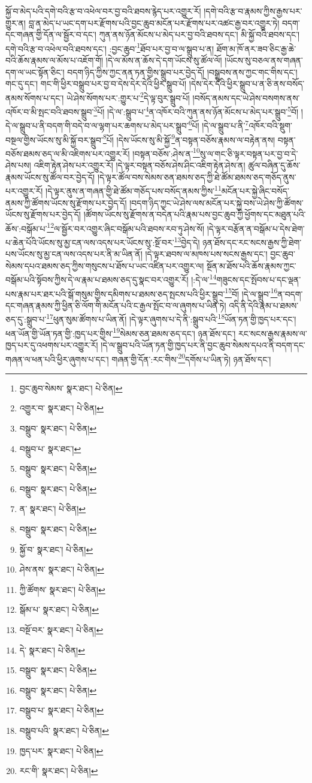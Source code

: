 སྐྱོ་བ་མེད་པའི་དགེ་བའི་རྩ་བ་འཕེལ་བར་བྱ་བའི་ཐབས་རྙེད་པར་འགྱུར་རོ། །དགེ་བའི་རྩ་བ་རྣམས་ཀྱིས་རྒྱས་པར་གྱུར་ན། བླ་ན་མེད་པ་ཡང་དག་པར་རྫོགས་པའི་བྱང་ཆུབ་མངོན་པར་རྫོགས་པར་འཚང་རྒྱ་བར་འགྱུར་ཏེ། བདག་དང་གཞན་གྱི་དོན་ལ་སྦྱོར་བ་དང་། ཀུན་ནས་ཉོན་མོངས་པ་མེད་པར་བྱ་བའི་ཐབས་དང་། མི་སྐྱོ་བའི་ཐབས་དང་། དགེ་བའི་རྩ་བ་འཕེལ་བའི་ཐབས་དང་། :བྱང་ཆུབ་\footnote{བྱང་ཆུབ་སེམས་  སྣར་ཐང་།  པེ་ཅིན། }ཐོབ་པར་བྱ་བ་ལ་སྒྲུབ་པ་ན། ཐོག་མ་ཁོ་ནར་ཟབ་ཅིང་རྒྱ་ཆེ་བའི་ཆོས་རྣམས་ལ་མོས་པ་འཇོག་གོ། །དེ་ལ་མོས་ན་ཆོས་དེ་དག་ཡོངས་སུ་ཚོལ་ལོ། །ཡོངས་སུ་བཅལ་ནས་གཞན་དག་ལ་ཡང་སྟོན་ཅིང་། བདག་ཉིད་ཀྱིས་ཀྱང་ནན་ཏན་གྱིས་སྒྲུབ་པར་བྱེད་དོ། །བསྒྲུབས་ནས་ཀྱང་གང་གིས་དང་། གང་དུ་དང་། གང་གི་ཕྱིར་བསྒྲུབ་པར་བྱ་བ་དེས་དེར་དེའི་ཕྱིར་སྒྲུབ་པོ། །དེས་དེར་དེའི་ཕྱིར་སྒྲུབ་པ་ན་ཅི་ནས་བསོད་ནམས་སོགས་པ་དང་། ཡེ་ཤེས་སོགས་པར་:གྱུར་པ་\footnote{འགྱུར་བ་  སྣར་ཐང་།  པེ་ཅིན། }དེ་ལྟ་བུར་སྒྲུབ་པོ། །བསོད་ནམས་དང་ཡེ་ཤེས་བསགས་ནས་འཁོར་བ་མི་སྤང་བའི་ཐབས་སྒྲུབ་\footnote{བསྒྲུབ་  སྣར་ཐང་།  པེ་ཅིན། }པོ། །དེ་ལ་:སྒྲུབ་པ་\footnote{བསྒྲུབ་པ་  སྣར་ཐང་། }ན་འཁོར་བའི་ཀུན་ནས་ཉོན་མོངས་པ་མེད་པར་སྒྲུབ་\footnote{བསྒྲུབ་  སྣར་ཐང་།  པེ་ཅིན། }བོ། །དེ་ལ་སྒྲུབ་པ་ནི་བདག་གི་བདེ་བ་ལ་ལྷག་པར་ཆགས་པ་མེད་པར་སྒྲུབ་\footnote{བསྒྲུབ་  སྣར་ཐང་།  པེ་ཅིན། }པོ། །དེ་ལ་སྒྲུབ་པ་ནི་\footnote{ན་  སྣར་ཐང་།  པེ་ཅིན། }འཁོར་བའི་སྡུག་བསྔལ་གྱིས་ཡོངས་སུ་མི་སྐྱོ་བར་སྒྲུབ་\footnote{བསྒྲུབ་  སྣར་ཐང་།  པེ་ཅིན། }པོ། །དེས་ཡོངས་སུ་མི་སྐྱོ་\footnote{སྐྱོ་བ་  སྣར་ཐང་།  པེ་ཅིན། }ན་བསྟན་བཅོས་རྣམས་ལ་བརྟེན་ནས། བསྟན་བཅོས་ཐམས་ཅད་ལ་མི་འཇིགས་པར་འགྱུར་རོ། །བསྟན་བཅོས་:ཤེས་ན་\footnote{ཤེས་ནས་  སྣར་ཐང་།  པེ་ཅིན། }སུ་ལ་གང་ཅི་ལྟར་བསྟན་པར་བྱ་བ་དེ་ཤེས་པས། འཇིག་རྟེན་ཤེས་པར་འགྱུར་རོ། །དེ་ལྟར་བསྟན་བཅོས་ཤེས་ཤིང་འཇིག་རྟེན་ཤེས་ན། ཚུལ་བཞིན་དུ་ཆོས་རྣམས་ཡོངས་སུ་ཚོལ་བར་བྱེད་དོ། །དེ་ལྟར་ཚོལ་བས་སེམས་ཅན་ཐམས་ཅད་ཀྱི་ཐེ་ཚོམ་ཐམས་ཅད་གཅོད་ནུས་པར་འགྱུར་རོ། །དེ་ལྟར་ནུས་ན་གཞན་གྱི་ཐེ་ཚོམ་གཅོད་པས་བསོད་ནམས་ཀྱིས་\footnote{ཀྱི་ཚོགས་  སྣར་ཐང་།  པེ་ཅིན། }མངོན་པར་སྐྱེ་ཞིང་བསོད་ནམས་ཀྱི་ཚོགས་ཡོངས་སུ་རྫོགས་པར་བྱེད་དོ། །བདག་ཉིད་ཀྱང་ཡེ་ཤེས་ལས་མངོན་པར་སྐྱེ་བས་ཡེ་ཤེས་ཀྱི་ཚོགས་ཡོངས་སུ་རྫོགས་པར་བྱེད་དོ། །ཚོགས་ཡོངས་སུ་རྫོགས་ན་བདེན་པའི་རྣམ་པས་བྱང་ཆུབ་ཀྱི་ཕྱོགས་དང་མཐུན་པའི་ཆོས་:བསྒོམ་པ་\footnote{སྒོམ་པ་  སྣར་ཐང་།  པེ་ཅིན། }ལ་སྦྱོར་བར་འགྱུར་ཞིང་བསྒོམ་པའི་ཐབས་རབ་ཏུ་ཤེས་སོ། །དེ་ལྟར་བརྩོན་ན་བསྒོམ་པ་དེས་ཐེག་པ་ཆེན་པོའི་ཡོངས་སུ་མྱ་ངན་ལས་འདས་པར་ཡོངས་སུ་:སྔོ་བར་\footnote{བསྔོ་བར་  སྣར་ཐང་།  པེ་ཅིན། }བྱེད་དེ། ཉན་ཐོས་དང་རང་སངས་རྒྱས་ཀྱི་ཐེག་པས་ཡོངས་སུ་མྱ་ངན་ལས་འདས་པར་ནི་མ་ཡིན་ནོ། །དེ་ལྟར་ཐབས་ལ་མཁས་པས་སངས་རྒྱས་དང་། བྱང་ཆུབ་སེམས་དཔའ་ཐམས་ཅད་ཀྱིས་གསུངས་པ་ཐོས་པ་ཡང་འཛིན་པར་འགྱུར་ལ། སྔོན་མ་ཐོས་པའི་ཆོས་རྣམས་ཀྱང་བསྒོམ་པའི་སྟོབས་ཀྱིས་དེ་ལ་རྣམ་པ་ཐམས་ཅད་དུ་སྣང་བར་འགྱུར་རོ། །:དེ་ལ་\footnote{དེ་  སྣར་ཐང་།  པེ་ཅིན། }གཟུངས་དང་སྤོབས་པ་དང་ལྡན་པས་རྣམ་པར་ཐར་པའི་སྒོ་གསུམ་གྱིས་དམིགས་པ་ཐམས་ཅད་སྤངས་པའི་ཕྱིར་སྒྲུབ་\footnote{བསྒྲུབ་  སྣར་ཐང་།  པེ་ཅིན། }བོ། །དེ་ལ་སྒྲུབ་\footnote{བསྒྲུབ་  སྣར་ཐང་།  པེ་ཅིན། }ན་བདག་དང་གཞན་རྣམས་ཀྱི་ཕྱིན་ཅི་ལོག་གི་མངོན་པའི་ང་རྒྱལ་སྤོང་བ་ལ་ཞུགས་པ་ཡིན་ཏེ། འདི་ནི་དེའི་རྣམ་པ་ཐམས་ཅད་དུ་:སྒྲུབ་པ་\footnote{བསྒྲུབ་པ་  སྣར་ཐང་།  པེ་ཅིན། }ཕུན་སུམ་ཚོགས་པ་ཡིན་ནོ། །དེ་ལྟར་ཞུགས་པ་དེ་ནི་:སྒྲུབ་པའི་\footnote{བསྒྲུབ་པའི་  སྣར་ཐང་།  པེ་ཅིན། }ཡོན་ཏན་གྱི་ཁྱད་པར་དང་། ཕན་ཡོན་གྱི་ཡོན་ཏན་གྱི་:ཁྱད་པར་གྱིས་\footnote{ཁྱད་པར་  སྣར་ཐང་།  པེ་ཅིན། }སེམས་ཅན་ཐམས་ཅད་དང་། ཉན་ཐོས་དང་། རང་སངས་རྒྱས་རྣམས་ལ་ཁྱད་པར་དུ་འཕགས་པར་འགྱུར་རོ། །དེ་ལ་སྒྲུབ་པའི་ཡོན་ཏན་གྱི་ཁྱད་པར་ནི་བྱང་ཆུབ་སེམས་དཔའ་ནི་བདག་དང་གཞན་ལ་ཕན་པའི་ཕྱིར་ཞུགས་པ་དང་། གཞན་གྱི་དོན་:རང་གིས་\footnote{རང་གི་  སྣར་ཐང་།  པེ་ཅིན། }དགོས་པ་ཡིན་ཏེ། ཉན་ཐོས་དང་། 